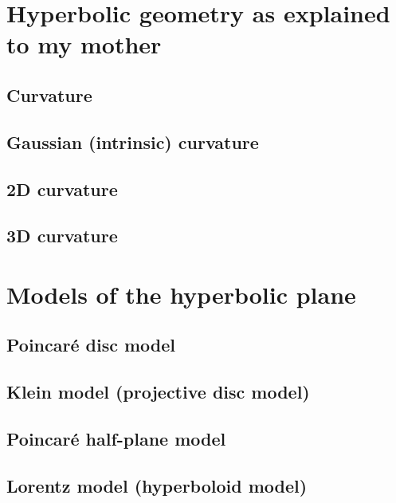 \documentclass{article}
\title{\todo{FANCY TITLE}}
\author{BarbaraJoy Jones}
\date{\todo{16 October 2009}}
\begin{document}
\maketitle

\section{Hyperbolic geometry as explained to my mother}
\subsection{Curvature}
\subsection{Gaussian (intrinsic) curvature}
\subsection{2D curvature}
\subsection{3D curvature}

\section{Models of the hyperbolic plane}
\subsection{Poincar\'e disc model}
\subsection{Klein model (projective disc model)}
\subsection{Poincar\'e half-plane model}
\subsection{Lorentz model (hyperboloid model)}
\end{document}
